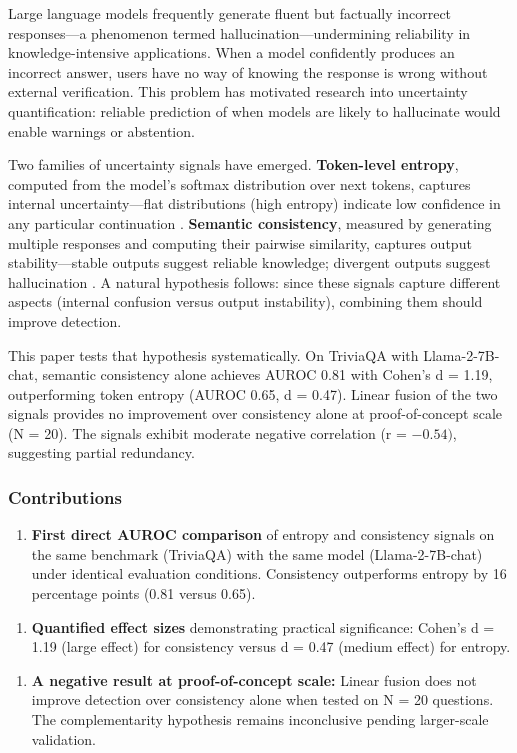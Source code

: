 
Large language models frequently generate fluent but factually incorrect responses---a phenomenon termed hallucination---undermining reliability in knowledge-intensive applications. When a model confidently produces an incorrect answer, users have no way of knowing the response is wrong without external verification. This problem has motivated research into uncertainty quantification: reliable prediction of when models are likely to hallucinate would enable warnings or abstention.

Two families of uncertainty signals have emerged. \textbf{Token-level entropy}, computed from the model's softmax distribution over next tokens, captures internal uncertainty---flat distributions (high entropy) indicate low confidence in any particular continuation \citep{kuhn2023semantic}. \textbf{Semantic consistency}, measured by generating multiple responses and computing their pairwise similarity, captures output stability---stable outputs suggest reliable knowledge; divergent outputs suggest hallucination \citep{manakul2023selfcheckgpt}. A natural hypothesis follows: since these signals capture different aspects (internal confusion versus output instability), combining them should improve detection.

This paper tests that hypothesis systematically. On TriviaQA with Llama-2-7B-chat, semantic consistency alone achieves AUROC 0.81 with Cohen's d = 1.19, outperforming token entropy (AUROC 0.65, d = 0.47). Linear fusion of the two signals provides no improvement over consistency alone at proof-of-concept scale (N = 20). The signals exhibit moderate negative correlation (r = $-0.54)$, suggesting partial redundancy.

\subsubsection{Contributions}

\begin{enumerate}
\item \textbf{First direct AUROC comparison} of entropy and consistency signals on the same benchmark (TriviaQA) with the same model (Llama-2-7B-chat) under identical evaluation conditions. Consistency outperforms entropy by 16 percentage points (0.81 versus 0.65).
\end{enumerate}

\begin{enumerate}
\item \textbf{Quantified effect sizes} demonstrating practical significance: Cohen's d = 1.19 (large effect) for consistency versus d = 0.47 (medium effect) for entropy.
\end{enumerate}

\begin{enumerate}
\item \textbf{A negative result at proof-of-concept scale:} Linear fusion does not improve detection over consistency alone when tested on N = 20 questions. The complementarity hypothesis remains inconclusive pending larger-scale validation.
\end{enumerate}

